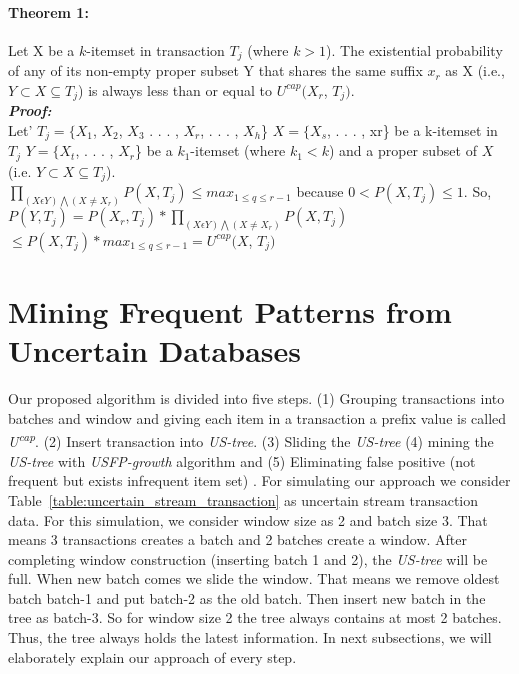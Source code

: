 	\paragraph{Theorem 1: } Let X be a $k$-itemset in transaction $T_j$ (where $k > 1$). The existential probability of any of its non-empty proper subset Y that shares the same suffix $x_r$ as X (i.e., $Y \subset X \subseteq T_j$) is always less than or equal to $U^{cap}(X_r$, $T_j)$.\\
		\emph{\textbf{Proof:}}\\
		Let'
		$T_j = \{X_1$, $X_2$, $X_3$ . . . , $X_r$, . . . , $X_h$\}
		$X = \{X_s$, . . . , xr\} be a k-itemset in $T_j$
		$Y = \{X_t$, . . . , $X_r$\} be a $k_1$-itemset (where $k_1 < k$) and a proper subset of $X$ (i.e. $Y \subset X \subseteq T_j$).\\
		$\prod_{(X \epsilon Y)\bigwedge (X\neq X_r)}P(X,T_j) \leq max_{1 \leq q \leq r-1}$ because $0< P(X, T_j)\leq 1$. So,\\
		 $P(Y,T_j)=P(X_r,T_j)*\prod_{(X \epsilon Y)\bigwedge (X\neq X_r)}P(X,T_j)$\\
		 $\leq P(X,T_j)*max_{1 \leq q \leq r-1}=U^{cap}(X$, $T_j)$
 
\section{Mining Frequent Patterns from Uncertain Databases}
    Our proposed algorithm is divided into five steps. (1) Grouping transactions into batches and window and giving each item in a transaction a prefix value is called \emph{U\textsuperscript{cap}}. (2) Insert transaction into \emph {US-tree}. (3) Sliding the \emph {US-tree} (4) mining the \emph {US-tree} with \emph{USFP-growth} algorithm and (5) Eliminating false positive (not frequent but exists infrequent item set) . For simulating our approach we consider Table~\ref{table:uncertain_stream_transaction} as uncertain stream transaction data. For this simulation, we consider window size as 2 and batch size 3. That means 3 transactions creates a batch and 2 batches create a window. After completing window construction (inserting batch 1 and 2), the \emph {US-tree} will be full. When new batch comes we slide the window. That means we remove oldest batch batch-1 and put batch-2 as the old batch. Then insert new batch in the tree as batch-3. So for window size 2 the tree always contains at most 2 batches. Thus, the tree always holds the latest information. In next subsections, we will elaborately explain our approach of every step.

